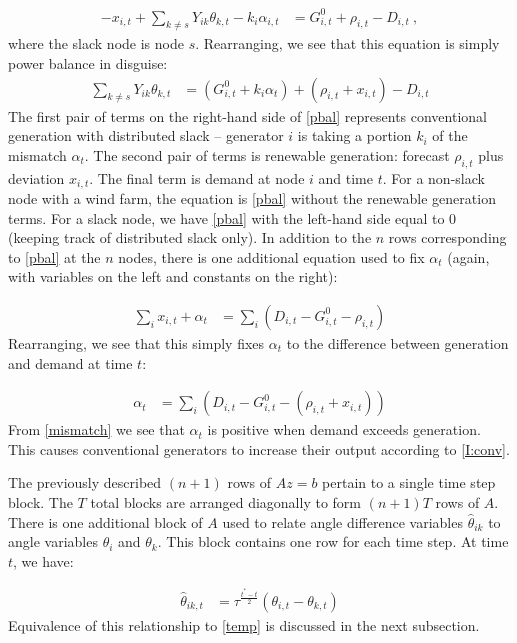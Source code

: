 \documentclass[conference]{IEEEtran}
\begin{document}
\begin{align*}
-x_{i,t} + \sum\limits_{k\neq s} Y_{ik}\theta_{k,t} - k_i\alpha_{i,t} &= G_{i,t}^0 + \rho_{i,t} - D_{i,t}~,
\end{align*}
where the slack node is node $s$. Rearranging, we see that this equation is simply power balance in disguise:
\begin{align}\label{pbal}
\sum\limits_{k\neq s} Y_{ik}\theta_{k,t}  &= (G_{i,t}^0 + k_i\alpha_t) + (\rho_{i,t} + x_{i,t}) - D_{i,t}
\end{align}
The first pair of terms on the right-hand side of \eqref{pbal} represents conventional generation with distributed slack -- generator $i$ is taking a portion $k_i$ of the mismatch $\alpha_t$. The second pair of terms is renewable generation: forecast $\rho_{i,t}$ plus deviation $x_{i,t}$. The final term is demand at node $i$ and time $t$. For a non-slack node with a wind farm, the equation is \eqref{pbal} without the renewable generation terms. For a slack node, we have \eqref{pbal} with the left-hand side equal to 0 (keeping track of distributed slack only). In addition to the $n$ rows corresponding to \eqref{pbal} at the $n$ nodes, there is one additional equation used to fix $\alpha_t$ (again, with variables on the left and constants on the right):

\begin{align*}
\sum_i x_{i,t} + \alpha_t &= \sum_i (D_{i,t} - G_{i,t}^0 - \rho_{i,t})
\end{align*}
Rearranging, we see that this simply fixes $\alpha_t$ to the difference between generation and demand at time $t$:

\begin{align}\label{mismatch}
 \alpha_t &= \sum_i \left(D_{i,t} - G_{i,t}^0 - (\rho_{i,t} + x_{i,t})\right)
\end{align}
From \eqref{mismatch} we see that $\alpha_t$ is positive when demand exceeds generation. This causes conventional generators to increase their output according to \eqref{I:conv}.

The previously described $(n+1)$ rows of $Az=b$ pertain to a single time step block. The $T$ total blocks are arranged diagonally to form $(n+1)T$ rows of $A$. There is one additional block of $A$ used to relate angle difference variables $\hat{\theta}_{ik}$ to angle variables $\theta_i$ and $\theta_k$. This block contains one row for each time step. At time $t$, we have:

\begin{align}\label{thetahat}
\hat{\theta}_{ik,t} &= \tau^{\frac{t^*-t}{2}}(\theta_{i,t} - \theta_{k,t})
\end{align}
Equivalence of this relationship to \eqref{temp} is discussed in the next subsection.
\end{document}
